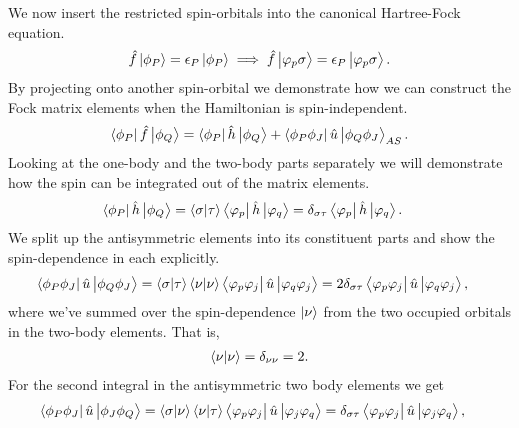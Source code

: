             We now insert the restricted spin-orbitals into the canonical
            Hartree-Fock equation.
            \begin{align}
                \hat{f}\ket{\phi_P} = \epsilon_P\ket{\phi_P}
                \implies
                \hat{f}\ket{\varphi_p\sigma}
                = \epsilon_P\ket{\varphi_p\sigma}.
            \end{align}
            By projecting onto another spin-orbital we demonstrate how we can
            construct the Fock matrix elements when the Hamiltonian is
            spin-independent.
            \begin{align}
                \bra{\phi_P}\hat{f}\ket{\phi_Q}
                = \bra{\phi_P}\hat{h}\ket{\phi_Q}
                + \bra{\phi_P\phi_J}\hat{u}\ket{\phi_Q\phi_J}_{AS}.
                \label{eq:mo-fock-elements}
            \end{align}
            Looking at the one-body and the two-body parts separately we will
            demonstrate how the spin can be integrated out of the matrix
            elements.
            \begin{align}
                \bra{\phi_P}\hat{h}\ket{\phi_Q}
                &= \braket{\sigma}{\tau}\bra{\varphi_p}\hat{h}\ket{\varphi_q}
                = \delta_{\sigma\tau}\bra{\varphi_p}\hat{h}\ket{\varphi_q}.
            \end{align}
            We split up the antisymmetric elements into its constituent parts
            and show the spin-dependence in each explicitly.
            \begin{align}
                \bra{\phi_P\phi_J}\hat{u}\ket{\phi_Q\phi_J}
                &= \braket{\sigma}{\tau}\braket{\nu}{\nu}
                \bra{\varphi_p\varphi_j}\hat{u}\ket{\varphi_q\varphi_j}
                = 2 \delta_{\sigma\tau}
                \bra{\varphi_p\varphi_j}\hat{u}\ket{\varphi_q\varphi_j},
            \end{align}
            where we've summed over the spin-dependence $\ket{\nu}$ from the two
            occupied orbitals in the two-body elements.
            That is,
            \begin{align}
                \braket{\nu}{\nu} = \delta_{\nu\nu} = 2.
            \end{align}
            For the second integral in the antisymmetric two body elements we
            get
            \begin{align}
                \bra{\phi_P\phi_J}\hat{u}\ket{\phi_J\phi_Q}
                &= \braket{\sigma}{\nu}\braket{\nu}{\tau}
                \bra{\varphi_p\varphi_j}\hat{u}\ket{\varphi_j\varphi_q}
                = \delta_{\sigma\tau}
                \bra{\varphi_p\varphi_j}\hat{u}\ket{\varphi_j\varphi_q},
            \end{align}
